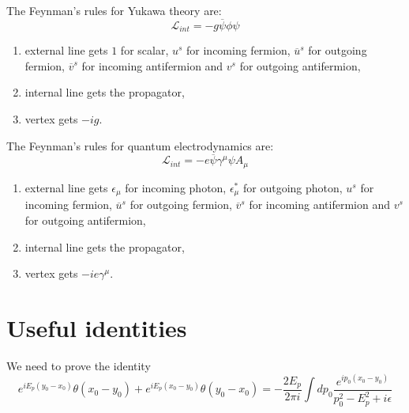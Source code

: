 \documentclass[a4paper]{article}
\begin{document}
    The Feynman's rules for Yukawa theory are: \[ \mathcal  L_{int} = - g \overline \psi \phi \psi\]
    \begin{enumerate}
        \item external line gets $1$ for scalar, $u^s$ for incoming fermion, $\overline u^s$ for outgoing fermion, $\overline v^s$ for incoming antifermion and $v^s$ for outgoing antifermion,
        \item internal line gets the propagator,
        \item vertex gets $-ig$.
    \end{enumerate}

    The Feynman's rules for quantum electrodynamics are: \[ \mathcal L_{int} = - e \overline \psi \gamma^\mu \psi A_\mu \]
    \begin{enumerate} 
        \item external line gets $\epsilon_\mu$ for incoming photon, $\epsilon_\mu^*$ for outgoing photon, $u^s$ for incoming fermion, $\overline u^s$ for outgoing fermion, $\overline v^s$ for incoming antifermion and $v^s$ for outgoing antifermion,
        \item internal line gets the propagator,
        \item vertex gets $-ie\gamma^\mu$.
    \end{enumerate}

\appendix 

\section{Useful identities} 

    We need to prove the identity
    \begin{equation}\label{feyn}
        e^{i E_p (y_0 - x_0) } \theta(x_0 - y_0) + e^{i E_p (x_0 - y_0) } \theta(y_0 - x_0) = - \frac{2 E_p}{2 \pi i} \int d p_0 \frac{e^{i p_0 (x_0 - y_0)}}{p_0^2 - E_p^2 + i \epsilon} 
    \end{equation}
\end{document}
